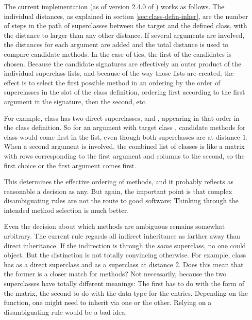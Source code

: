 \documentclass[11pt]{article}
\begin{document}
The current implementation (as of version 2.4.0 of \R{}) works as follows.
The individual distances, as explained in section \ref{sec:class-defin-inher}, are the number of steps in the path of superclasses between the target and the defined class, with the distance to  larger than any other distance.
If several arguments are involved, the distances for each argument are added and the total distance is used to compare candidate methods.
In the case of ties, the first of the candidates is chosen.
Because the candidate signatures are effectively an outer product of the individual superclass lists, and because of the way those lists are created, the effect is to select the first possible method in an ordering by the order of superclasses in the  slot of the class definition, ordering first according to the first argument in the signature, then the second, etc.

For example, class  has two direct superclasses,  and , appearing in that order in the class definition.
So for an argument with target class , candidate methods for class  would come first in the list, even though both superclasses are at distance 1.
When a second argument is involved, the combined list of classes is like a matrix with rows corresponding to the first argument and columns to the second, so the first choice or the first argument comes first.

This determines the effective ordering of methods, and it probably reflects as reasonable a decision as any.
But again, the important point is that complex disambiguating rules are not the route to good software:  Thinking through the intended method selection is much better.

Even the decision about which methods are ambiguous remains somewhat arbitrary.
The current rule regards all indirect inheritance as farther away than direct inheritance.
If the indirection is through the \emph{same}  superclass, no one could object.
But the distinction is not totally convincing otherwise.
For example, class  has  as a direct superclass and  as a superclass at distance 2.
Does this mean that the former is a closer match for methods?
Not necessarily, because the two superclasses have totally different meanings:  The first has to do with the form of the matrix, the second to do with the data type for the entries.
Depending on the function, one might need to inherit via one or the other.
Relying on a disambiguating rule would be a bad idea.
\end{document}
